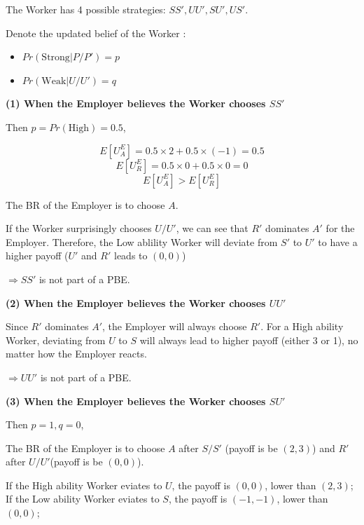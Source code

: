 \documentclass{article}
\begin{document}
\medskip

The Worker has 4 possible strategies: $SS',UU',SU',US'$. 

\smallskip

Denote the updated belief of the Worker :
\begin{itemize}
\item $Pr(\text{Strong} | P/P') = p$
\item $Pr(\text{Weak} | U/U') = q$
\end{itemize}


\textbf{(1) When the Employer believes the Worker chooses $SS'$}

Then $p=Pr(\text{High})=0.5$,

$$E[U^E_{A}] = 0.5 \times 2+ 0.5\times (-1) = 0.5$$
$$E[U^E_{R}] = 0.5 \times 0+ 0.5 \times 0 = 0$$
$$E[U^E_{A}]>E[U^E_{R}]$$

The BR of the Employer is to choose $A$.

\smallskip

If the Worker surprisingly chooses $U/U'$, we can see that $R'$ dominates $A'$
for the Employer. Therefore, the Low ablility Worker will deviate from $S'$ to $U'$
to have a higher payoff ($U'$ and $R'$ leads to $(0,0)$)

\smallskip

$\Rightarrow SS'$ is not part of a PBE.

\medskip

\textbf{(2) When the Employer believes the Worker chooses $UU'$}

\smallskip

Since $R'$ dominates $A'$, the Employer will always choose $R'$. 
For a High ability Worker, deviating from $U$ to $S$ will always lead to
higher payoff (either 3 or 1), no matter how the Employer reacts.

\smallskip

$\Rightarrow UU'$ is not part of a PBE.

\medskip

\textbf{(3) When the Employer believes the Worker chooses $SU'$}

\smallskip

Then $p=1,q=0$,

\smallskip

The BR of the Employer is to choose $A$ after $S/S'$ (payoff is be $(2,3)$) and $R'$ after $U/U'$(payoff is be $(0,0)$).

\smallskip

If the High ability Worker eviates to $U$, the payoff is $(0,0)$, lower than $(2,3)$;
If the Low ability Worker eviates to $S$, the payoff is $(-1,-1)$, lower than $(0,0)$;
\end{document}
